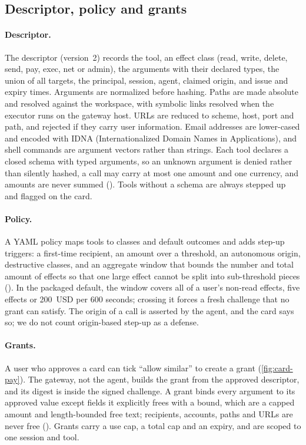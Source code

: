 \subsection{Descriptor, policy and grants}

\paragraph{Descriptor.} The descriptor (version~2) records the tool, an effect class (read, write, delete, send,
pay, exec, net or admin), the arguments with their declared types, the union of all targets, the principal,
session, agent, claimed origin, and issue and expiry times. Arguments are normalized before hashing. Paths are made
absolute and resolved against the workspace, with symbolic links resolved when the executor runs on the gateway
host. URLs are reduced to scheme, host, port and path, and rejected if they carry user information. Email
addresses are lower-cased and encoded with IDNA (Internationalized Domain Names in Applications), and shell
commands are argument vectors rather than strings. Each tool
declares a closed schema with typed arguments, so an unknown argument is denied rather than silently hashed, a call
may carry at most one amount and one currency, and amounts are never summed (). Tools without a schema are
always stepped up and flagged on the card.

\paragraph{Policy.} A YAML policy maps tools to classes and default outcomes and adds step-up triggers: a
first-time recipient, an amount over a threshold, an autonomous origin, destructive classes, and an aggregate
window that bounds the number and total amount of effects so that one large effect cannot be split into
sub-threshold pieces (). In the packaged default, the window covers all of a user's non-read effects,
five effects or 200~USD per 600 seconds; crossing it forces a fresh challenge that no grant can satisfy.
The origin of a call is asserted by the agent, and the card says so; we do not count origin-based step-up as a
defense.

\paragraph{Grants.} A user who approves a card can tick ``allow similar'' to create a grant (\cref{fig:card-pay}).
The gateway, not the agent, builds the grant from the approved descriptor, and its digest is inside the signed
challenge. A grant binds every argument to its approved value except fields it explicitly frees with a bound,
which are a capped amount and length-bounded free text; recipients, accounts, paths and URLs are never free
(). Grants carry a use cap, a total cap and an expiry, and are scoped to one session and tool.

